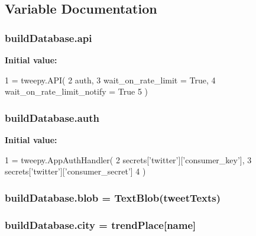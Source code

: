 \subsection{Variable Documentation}
\subsubsection[{\texorpdfstring{api}{api}}]{\setlength{\rightskip}{0pt plus 5cm}build\+Database.\+api}\hypertarget{namespacebuildDatabase_acfedb69db26209f1c7555bd335a70860}{}\label{namespacebuildDatabase_acfedb69db26209f1c7555bd335a70860}
{\bfseries Initial value\+:}
\begin{DoxyCode}
1 = tweepy.API(
2     auth,
3     wait\_on\_rate\_limit = \textcolor{keyword}{True},
4     wait\_on\_rate\_limit\_notify = \textcolor{keyword}{True}
5 )
\end{DoxyCode}
\subsubsection[{\texorpdfstring{auth}{auth}}]{\setlength{\rightskip}{0pt plus 5cm}build\+Database.\+auth}\hypertarget{namespacebuildDatabase_ac63477d68e612f77cdca1d1adcc677da}{}\label{namespacebuildDatabase_ac63477d68e612f77cdca1d1adcc677da}
{\bfseries Initial value\+:}
\begin{DoxyCode}
1 = tweepy.AppAuthHandler(
2         secrets[\textcolor{stringliteral}{'twitter'}][\textcolor{stringliteral}{'consumer\_key'}],
3         secrets[\textcolor{stringliteral}{'twitter'}][\textcolor{stringliteral}{'consumer\_secret'}]
4 )
\end{DoxyCode}
\subsubsection[{\texorpdfstring{blob}{blob}}]{\setlength{\rightskip}{0pt plus 5cm}build\+Database.\+blob = Text\+Blob({\bf tweet\+Texts})}\hypertarget{namespacebuildDatabase_a05391cf14f340a054d4f2c708576be29}{}\label{namespacebuildDatabase_a05391cf14f340a054d4f2c708576be29}
\subsubsection[{\texorpdfstring{city}{city}}]{\setlength{\rightskip}{0pt plus 5cm}build\+Database.\+city = trend\+Place\mbox{[}\textquotesingle{}name\textquotesingle{}\mbox{]}}\hypertarget{namespacebuildDatabase_a2d66916cea7965a5f65dd98ef44dd261}{}\label{namespacebuildDatabase_a2d66916cea7965a5f65dd98ef44dd261}
